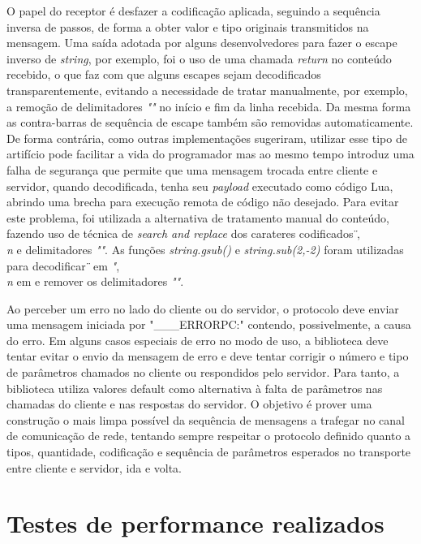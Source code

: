 \documentclass[11pt]{article}
\begin{document}
O papel do receptor é desfazer a codificação aplicada, seguindo a sequência
inversa de passos, de forma a obter valor e tipo originais transmitidos na
mensagem. Uma saída adotada por alguns desenvolvedores para fazer o escape
inverso de \textit{string}, por exemplo, foi o uso de uma chamada
\textit{return} no conteúdo recebido, o que faz com que alguns escapes sejam
decodificados transparentemente, evitando a necessidade de tratar manualmente,
por exemplo, a remoção de delimitadores \textit{""} no início e fim da linha recebida. Da
mesma forma as contra-barras de sequência de escape também são removidas
automaticamente. De forma contrária, como outras implementações sugeriram,
utilizar esse tipo de artifício pode facilitar a vida do programador mas ao mesmo
tempo introduz uma falha de segurança que permite que uma mensagem trocada
entre cliente e servidor, quando decodificada, tenha seu \textit{payload}
executado como código Lua, abrindo uma brecha para execução remota de código não
desejado. Para evitar este problema, foi utilizada a alternativa de tratamento
manual do conteúdo, fazendo uso de técnica de \textit{search and replace} dos
carateres codificados \textit{\"}, \textit{\\n} e delimitadores \textit{""}. As funções
\textit{string.gsub()} e \textit{string.sub(2,-2)} foram utilizadas para
decodificar \textit{\"} em \textit{"}, \textit{\\n} em \textit{\n} e remover os
delimitadores \textit{""}.

Ao perceber um erro no lado do cliente ou do servidor, o protocolo deve enviar
uma mensagem iniciada por "___ERRORPC:" contendo, possivelmente, a causa do
erro. Em alguns casos especiais de erro no modo de uso, a biblioteca deve tentar evitar
o envio da mensagem de erro e deve tentar corrigir o número e tipo de parâmetros chamados no
cliente ou respondidos pelo servidor. Para tanto, a biblioteca utiliza valores default como
alternativa à falta de parâmetros nas chamadas do cliente e nas respostas do
servidor. O objetivo é prover uma construção o mais limpa possível da sequência
de mensagens a trafegar no canal de comunicação de rede, tentando sempre respeitar o
protocolo definido quanto a tipos, quantidade, codificação e sequência de
parâmetros esperados no transporte entre cliente e servidor, ida e volta.

\section{Testes de performance realizados}\label{sec:perf}
\end{document}
